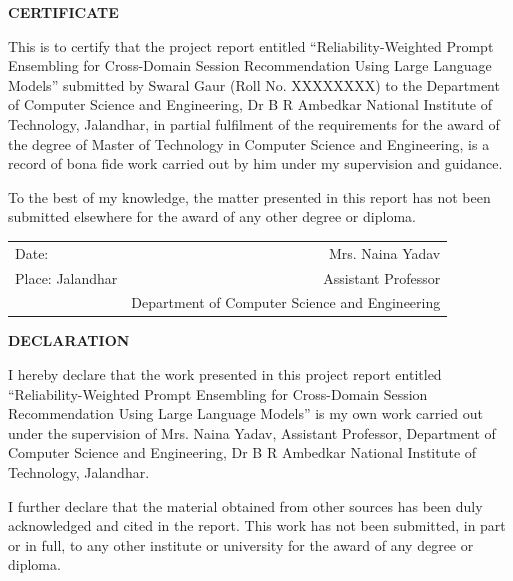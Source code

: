 \documentclass[12pt,a4paper,oneside]{report}
\newcommand{\mynamemixed}{Swaral Gaur}
\newcommand{\myrollno}{XXXXXXXX}          %
\newcommand{\supervisorname}{Mrs. Naina Yadav}
\newcommand{\supervisordesignation}{Assistant Professor}  %
\newcommand{\reporttitle}{Reliability-Weighted Prompt Ensembling for Cross-Domain
Session Recommendation Using Large Language Models}
\begin{document}
\clearpage
{}
\setcounter{page}{1}

\thispagestyle{plain}
\begin{center}
{\large\bfseries CERTIFICATE}
\end{center}
\vspace{0.2in}

This is to certify that the project report entitled ``\reporttitle'' submitted by
\mynamemixed{} (Roll No. \myrollno) to the Department of Computer Science and
Engineering, Dr B R Ambedkar National Institute of Technology, Jalandhar, in
partial fulfilment of the requirements for the award of the degree of Master of
Technology in Computer Science and Engineering, is a record of bona fide work
carried out by him under my supervision and guidance.

To the best of my knowledge, the matter presented in this report has not been
submitted elsewhere for the award of any other degree or diploma.

\vspace{0.8in}

\noindent
\begin{tabularx}{\textwidth}{@{}Xr@{}}
Date: & \supervisorname\\[4pt]
Place: Jalandhar & \supervisordesignation\\[4pt]
 & Department of Computer Science and Engineering\\
\end{tabularx}

\clearpage

\thispagestyle{plain}
\begin{center}
{\large\bfseries DECLARATION}
\end{center}
\vspace{0.2in}

I hereby declare that the work presented in this project report entitled
``\reporttitle'' is my own work carried out under the supervision of
\supervisorname, \supervisordesignation, Department of Computer Science and
Engineering, Dr B R Ambedkar National Institute of Technology, Jalandhar.

I further declare that the material obtained from other sources has been duly
acknowledged and cited in the report. This work has not been submitted, in part
or in full, to any other institute or university for the award of any degree or
diploma.
\end{document}
